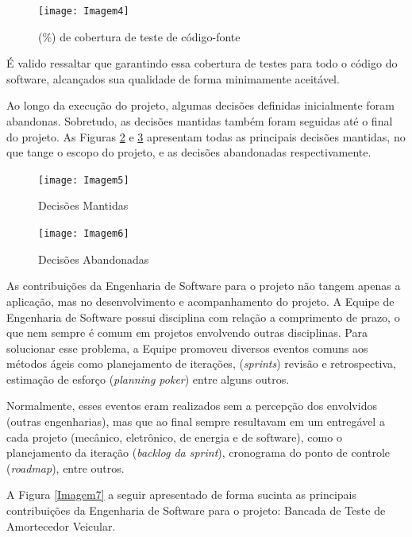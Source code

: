		\begin{figure}[htpb]
			\centering
			\texttt{[image: Imagem4]}
			\caption{(\%) de cobertura de teste de código-fonte}
			\label{Imagem4}
		\end{figure}

		É valido ressaltar que garantindo essa cobertura de testes para todo o código do software, alcançados sua qualidade de forma minimamente aceitável.

		
		Ao longo da execução do projeto, algumas decisões definidas inicialmente foram abandonas. Sobretudo, as decisões mantidas também foram seguidas até o final do projeto. As Figuras \ref{Imagem5} e \ref{Imagem6} apresentam todas as principais decisões mantidas, no que tange o escopo do projeto, e as decisões abandonadas respectivamente.

		\begin{figure}[htpb]
			\centering
			\texttt{[image: Imagem5]}
			\caption{Decisões Mantidas}
			\label{Imagem5}
		\end{figure}

		\begin{figure}[htpb]
			\centering
			\texttt{[image: Imagem6]}
			\caption{Decisões Abandonadas}
			\label{Imagem6}
		\end{figure}

	\newpage

		As contribuições da Engenharia de Software para o projeto não tangem apenas a aplicação, mas no desenvolvimento e acompanhamento do projeto. A Equipe de Engenharia de Software possui disciplina com relação a comprimento de prazo, o que nem sempre é comum em projetos envolvendo outras disciplinas. Para solucionar esse problema, a Equipe promoveu diversos eventos comuns aos métodos ágeis como planejamento de iterações, (\textit{sprints}) revisão e retrospectiva, estimação de esforço (\textit{planning poker}) entre alguns outros.
		
		Normalmente, esses eventos eram realizados sem a percepção dos envolvidos (outras engenharias), mas que ao final sempre resultavam em um entregável a cada projeto (mecânico, eletrônico, de energia e de software), como o planejamento da iteração (\textit{backlog da sprint}), cronograma do ponto de controle (\textit{roadmap}), entre outros.
		
		A Figura \ref{Imagem7} a seguir apresentado de forma sucinta as principais contribuições da Engenharia de Software para o projeto: Bancada de Teste de Amortecedor Veicular.

